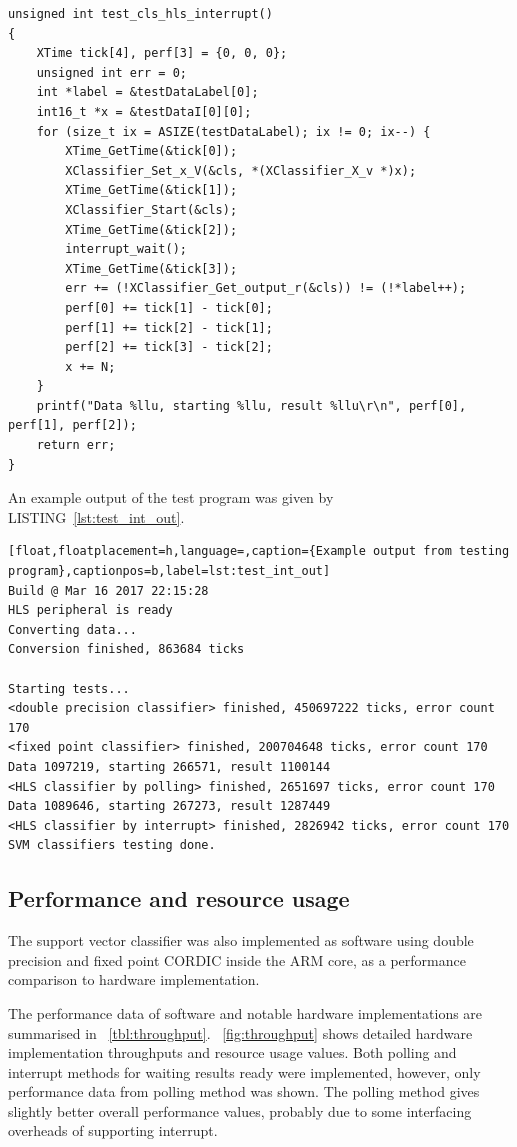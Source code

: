 \documentclass[journal]{IEEEtran}
\newcommand{\fref}[1]{\figurename~\ref{#1}}
\newcommand{\tref}[1]{\tablename~\ref{#1}}
\newcommand{\lref}[1]{LISTING~\ref{#1}}
\begin{document}
\begin{lstlisting}[float,floatplacement=h,caption={Code for recoding execution time for different procedures},captionpos=b,label=lst:test_int]
unsigned int test_cls_hls_interrupt()
{
	XTime tick[4], perf[3] = {0, 0, 0};
	unsigned int err = 0;
	int *label = &testDataLabel[0];
	int16_t *x = &testDataI[0][0];
	for (size_t ix = ASIZE(testDataLabel); ix != 0; ix--) {
		XTime_GetTime(&tick[0]);
		XClassifier_Set_x_V(&cls, *(XClassifier_X_v *)x);
		XTime_GetTime(&tick[1]);
		XClassifier_Start(&cls);
		XTime_GetTime(&tick[2]);
		interrupt_wait();
		XTime_GetTime(&tick[3]);
		err += (!XClassifier_Get_output_r(&cls)) != (!*label++);
		perf[0] += tick[1] - tick[0];
		perf[1] += tick[2] - tick[1];
		perf[2] += tick[3] - tick[2];
		x += N;
	}
	printf("Data %llu, starting %llu, result %llu\r\n", perf[0], perf[1], perf[2]);
	return err;
}
\end{lstlisting}

An example output of the test program was given by \lref{lst:test_int_out}.

\begin{lstlisting}[float,floatplacement=h,language=,caption={Example output from testing program},captionpos=b,label=lst:test_int_out]
Build @ Mar 16 2017 22:15:28
HLS peripheral is ready
Converting data...
Conversion finished, 863684 ticks

Starting tests...
<double precision classifier> finished, 450697222 ticks, error count 170
<fixed point classifier> finished, 200704648 ticks, error count 170
Data 1097219, starting 266571, result 1100144
<HLS classifier by polling> finished, 2651697 ticks, error count 170
Data 1089646, starting 267273, result 1287449
<HLS classifier by interrupt> finished, 2826942 ticks, error count 170
SVM classifiers testing done.
\end{lstlisting}

\subsection{Performance and resource usage}

The support vector classifier was also implemented as software using double precision and fixed point CORDIC inside the ARM core, as a performance comparison to hardware implementation.

The performance data of software and notable hardware implementations are summarised in \tref{tbl:throughput}. \fref{fig:throughput} shows detailed hardware implementation throughputs and resource usage values. Both polling and interrupt methods for waiting results ready were implemented, however, only performance data from polling method was shown. The polling method gives slightly better overall performance values, probably due to some interfacing overheads of supporting interrupt.
\end{document}
